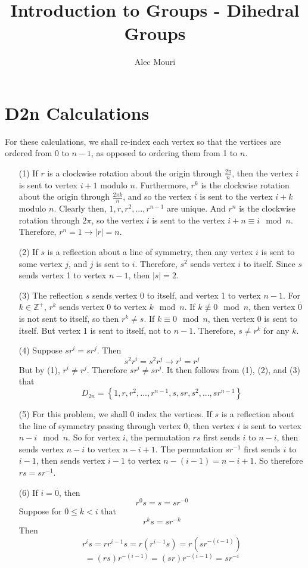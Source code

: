 \documentclass[12pt]{article}
\begin{document}
\title{Introduction to Groups - Dihedral Groups}
\author{Alec Mouri}

\maketitle
\section*{D2n Calculations}
For these calculations, we shall re-index each vertex so that the vertices are ordered from 0 to $n - 1$, as opposed to ordering them from 1 to $n$.
\begin{itemize}
\item[(1)] 
If $r$ is a clockwise rotation about the origin through $\frac{2\pi}{n}$, then the vertex $i$ is sent to vertex $i + 1$ modulo $n$. Furthermore, $r^k$ is the clockwise rotation about the origin through $\frac{2\pi k}{n}$, and so the vertex $i$ is sent to the vertex $i + k$ modulo $n$. Clearly then, $1, r, r^2, ..., r^{n - 1}$ are unique. And $r^n$ is the clockwise rotation through $2\pi$, so the vertex $i$ is sent to the vertex $i + n \equiv i \mod n$. Therefore, $r^n = 1 \rightarrow |r| = n$.
\item[(2)]
If $s$ is a reflection about a line of symmetry, then any vertex $i$ is sent to some vertex $j$, and $j$ is sent to $i$. Therefore, $s^2$ sends vertex $i$ to itself. Since $s$ sends vertex 1 to vertex $n - 1$, then $|s| = 2$.
\item[(3)]
The reflection $s$ sends vertex 0 to itself, and vertex 1 to vertex $n - 1$. For $k \in \mathbb{Z}^+$, $r^k$ sends vertex 0 to vertex $k \mod n$. If $k \not \equiv 0 \mod n$, then vertex 0 is not sent to itself, so then $r^k \neq s$. If $k \equiv 0 \mod n$, then vertex 0 is sent to itself. But vertex 1 is sent to itself, not to $n - 1$. Therefore, $s \neq r^k$ for any $k$.
\item[(4)]
Suppose $sr^i = sr^j$. Then
$$s^2r^i = s^2r^j \rightarrow r^i = r^j$$
But by (1), $r^i \neq r^j$. Therefore $sr^i \neq
sr^j$. It then follows from (1), (2), and (3) that
$$D_{2n} = \left\lbrace 1, r, r^2, ..., r^{n - 1}, s, sr, s^2, ..., sr^{n - 1}\right\rbrace$$
\item[(5)]
For this problem, we shall 0 index the vertices. If $s$ is a reflection about the line of symmetry passing through vertex 0, then vertex $i$ is sent to vertex $n - i \mod n$. So for vertex $i$, the permutation $rs$ first sends $i$ to $n - i$, then sends vertex $n - i$ to vertex $n - i + 1$. The permutation $sr^{-1}$ first sends $i$ to $i - 1$, then sends vertex $i - 1$ to vertex $n - (i - 1) = n - i + 1$. So therefore $rs = sr^{-1}$.
\item[(6)]
If $i = 0$, then
$$r^0s = s = sr^{-0}$$
Suppose for $0 \leq k < i$ that
$$r^ks = sr^{-k}$$
Then 
$$r^is = rr^{i - 1}s = r(r^{i - 1}s) = r(sr^{-(i - 1)})$$
$$= (rs)r^{-(i - 1)} = (sr)r^{-(i - 1)} = sr^{-i}$$
\end{itemize}
\end{document}
